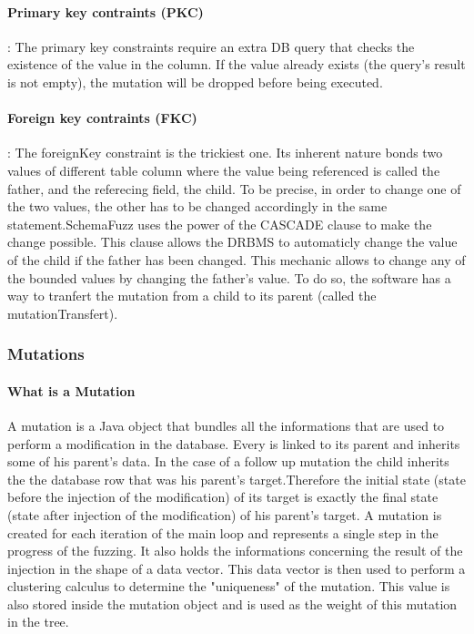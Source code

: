 \documentclass{article}
\begin{document}
\begin{empfile}
				\paragraph{Primary key contraints (PKC)} :
The primary key constraints require an extra DB query that checks the existence of the value in the column. If the value already exists (the query's result is not empty), the mutation will be dropped before being executed.
				\paragraph{Foreign key contraints (FKC)} :
The foreignKey constraint is the trickiest one. Its inherent nature bonds two values of different table column where the value being referenced is called the father, and the referecing field, the child. To be precise, in order to change one of the two values, the other has to be changed accordingly in the same statement.SchemaFuzz uses the power of the CASCADE clause to make the change possible. This clause allows the DRBMS to automaticly change the value of the child if the father has been changed.
This mechanic allows to change any of the bounded values by changing the father's value.
To do so, the software has a way to tranfert the mutation from a child to its parent (called the mutationTransfert).

  				
			\subsubsection{Mutations}
				\paragraph{What is a Mutation}
A mutation is a Java object that bundles all the informations that are used to perform a modification in the database. Every is linked to its parent and inherits some of his parent's data. In the case of a follow up mutation the child inherits the the database row that was his parent's target.Therefore the initial state (state before the injection of the modification) of its target is exactly the final state (state after injection of the modification) of his parent's target. A mutation is created for each iteration of the main loop and represents a single step in the progress of the fuzzing.
It also holds the informations concerning the result of the injection in the shape of a data vector. This data vector is then used to perform a clustering calculus to determine the "uniqueness" of the mutation. This value is also stored inside the mutation object and is used as the weight of this mutation in the tree.


\end{empfile}
\end{document}
